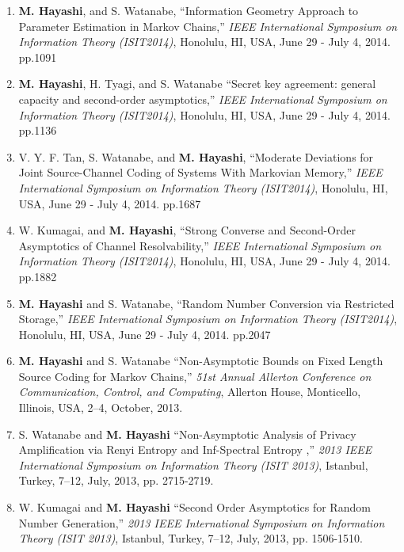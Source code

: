 \documentclass[a4paper,12pt,oneside]{article}
\begin{document}
\begin{enumerate}
\item 
\textbf{M. Hayashi}, and S. Watanabe, 
``Information Geometry Approach to Parameter Estimation in Markov Chains,'' {\em IEEE International Symposium on Information Theory (ISIT2014)}, Honolulu, HI, USA, June 29 - July 4, 2014. pp.1091

\item 
\textbf{M. Hayashi}, H. Tyagi, and S. Watanabe 
``Secret key agreement: general capacity and second-order asymptotics,'' 
{\em IEEE International Symposium on Information Theory (ISIT2014)}, Honolulu, HI, USA, June 29 - July 4, 2014. pp.1136

\item 
V. Y. F. Tan, S. Watanabe, and \textbf{M. Hayashi}, 
``Moderate Deviations for Joint Source-Channel Coding of Systems With Markovian Memory,'' 
{\em IEEE International Symposium on Information Theory (ISIT2014)}, Honolulu, HI, USA, June 29 - July 4, 2014. pp.1687

\item 
W. Kumagai, and \textbf{M. Hayashi}, 
``Strong Converse and Second-Order Asymptotics of Channel Resolvability,''
{\em IEEE International Symposium on Information Theory (ISIT2014)}, Honolulu, HI, USA, June 29 - July 4, 2014. pp.1882

\item 
\textbf{M. Hayashi} and S. Watanabe, 
``Random Number Conversion via Restricted Storage,'' 
{\em IEEE International Symposium on Information Theory (ISIT2014)}, Honolulu, HI, USA, June 29 - July 4, 2014. pp.2047

\item 
\textbf{M. Hayashi} and S. Watanabe
``Non-Asymptotic Bounds on Fixed Length Source Coding for Markov Chains,''
{\em 51st Annual Allerton Conference on Communication, Control, and Computing}, 
Allerton House, Monticello, Illinois, USA, 2--4, October, 2013.

\item 
S. Watanabe and \textbf{M. Hayashi}
``Non-Asymptotic Analysis of Privacy Amplification via Renyi Entropy and Inf-Spectral Entropy ,'' 
{\em 2013 IEEE International Symposium on Information Theory (ISIT 2013)}, 
Istanbul, Turkey, 7--12, July, 2013, pp. 2715-2719.

\item 
W. Kumagai and \textbf{M. Hayashi}
``Second Order Asymptotics for Random Number Generation,'' 
{\em 2013 IEEE International Symposium on Information Theory (ISIT 2013)}, 
Istanbul, Turkey, 7--12, July, 2013, pp. 1506-1510.


\end{enumerate}
\end{document}
